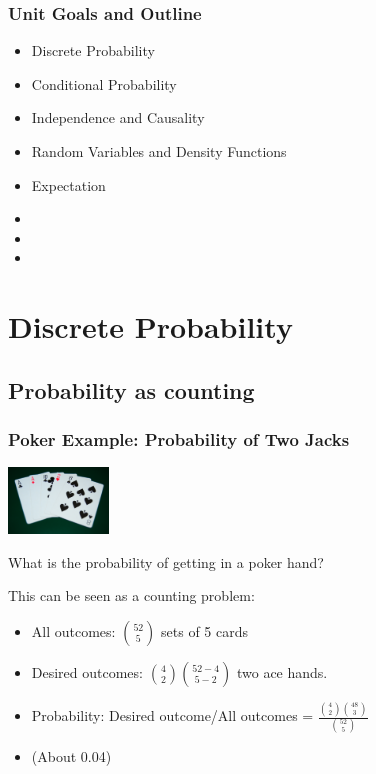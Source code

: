 \documentclass{beamer}
\begin{document}
\begin{frame}
  \frametitle{Unit Goals and Outline}
  {\larger

    \begin{itemize}
    \item Discrete Probability
    \item Conditional Probability
    \item \alert{Independence and Causality}
    \item \alert{Random Variables and Density Functions}
    \item \alert{Expectation}
    \item {}
    \item {}
    \item {}
    \end{itemize}

  }
\end{frame}

\section{Discrete Probability}

\subsection{Probability as counting}
\begin{frame}
  \frametitle{Poker Example: Probability of Two Jacks}

  \hfill\includegraphics[width=0.2\textwidth]{../img/poker_pair}
  
  {\larger

    What is the probability of getting 
    in a poker hand?

    \bigskip

    This can be seen as a counting problem:
    \begin{itemize}
    \item <2->All outcomes: $\binom{52}{5}$ sets of 5 cards
    \item <3->Desired outcomes: $\binom{4}{2}\binom{52-4}{5-2}$ two ace hands.
    \item <4->Probability: Desired outcome/All outcomes = $\frac{\binom{4}{2}\binom{48}{3}}{\binom{52}{5}}$
    \item <4-> (About 0.04)
    \end{itemize}
  }
\end{frame}
\end{document}
